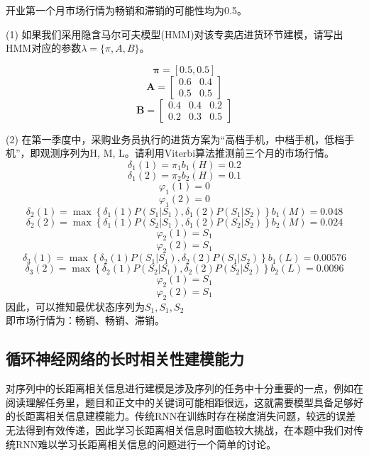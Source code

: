\documentclass[a4paper]{article}
\begin{document}
\hspace{2em}开业第一个月市场行情为畅销和滞销的可能性均为0.5。

\vspace{3mm}
(1) 如果我们采用隐含马尔可夫模型(HMM)对该专卖店进货环节建模，{\color{blue}请写出HMM对应的参数$\lambda=\{\pi, A, B\}$}。

$$ \mathbf{\pi} = \left[ 0.5, 0.5 \right] $$
$$ \mathbf{A} = \left[ \begin{array}{cc}
    0.6 & 0.4 \\
    0.5 & 0.5
\end{array} \right] $$
$$ \mathbf{B} = \left[ \begin{array}{ccc}
    0.4 & 0.4 & 0.2 \\
    0.2 & 0.3 & 0.5
\end{array} \right] $$

\vspace{3mm}
(2) 在第一季度中，采购业务员执行的进货方案为“高档手机，中档手机，低档手机”，即观测序列为H, M, L。{\color{blue}请利用Viterbi算法推测前三个月的市场行情}。
$$ \delta_1(1) = \pi_1 b_1(H) = 0.2 $$
$$ \delta_1(2) = \pi_2 b_2(H) = 0.1 $$
$$ \varphi_1(1) = 0 $$
$$ \varphi_1(2) = 0 $$
$$ \delta_2(1) = \max{\left\{\delta_1(1) P(S_1 | S_1), \delta_1(2) P(S_1 | S_2)\right\}} b_1(M) = 0.048 $$
$$ \delta_2(2) = \max{\left\{\delta_1(1) P(S_2 | S_1), \delta_1(2) P(S_2 | S_2)\right\}} b_2(M) = 0.024 $$
$$ \varphi_2(1) = S_1 $$
$$ \varphi_2(2) = S_1 $$
$$ \delta_3(1) = \max{\left\{\delta_2(1) P(S_1 | S_1), \delta_2(2) P(S_1 | S_2)\right\}} b_1(L) = 0.00576 $$
$$ \delta_3(2) = \max{\left\{\delta_2(1) P(S_2 | S_1), \delta_2(2) P(S_2 | S_2)\right\}} b_2(L) = 0.0096 $$
$$ \varphi_2(1) = S_1 $$
$$ \varphi_2(2) = S_1 $$
因此，可以推知最优状态序列为$ S_1, S_1, S_2 $ \\
即市场行情为：畅销、畅销、滞销。

\subsection{循环神经网络的长时相关性建模能力}

\hspace{2em}对序列中的长距离相关信息进行建模是涉及序列的任务中十分重要的一点，例如在阅读理解任务里，题目和正文中的关键词可能相距很远，这就需要模型具备足够好的长距离相关信息建模能力。传统RNN在训练时存在梯度消失问题，较远的误差无法得到有效传递，因此学习长距离相关信息时面临较大挑战，在本题中我们对传统RNN难以学习长距离相关信息的问题进行一个简单的讨论。
\end{document}
